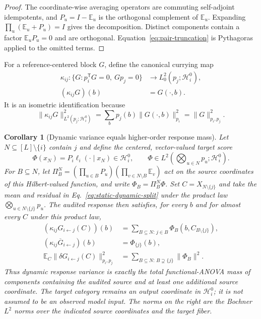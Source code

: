 \documentclass[10pt]{article}
\newcommand{\E}{\mathbb E}
\newtheorem{corollary}[theorem]{Corollary}
\theoremstyle{definition}
\theoremstyle{remark}
\begin{document}
\begin{proof}
The coordinate-wise averaging operators are commuting self-adjoint idempotents, and
$P_u=I-\mathbb E_u$ is the orthogonal complement of $\mathbb E_u$.  Expanding
$\prod_u(\mathbb E_u+P_u)=I$ gives the decomposition.  Distinct components contain a factor
$\mathbb E_uP_u=0$ and are orthogonal.  Equation~\ref{eq:pair-truncation} is Pythagoras applied to the
omitted terms.
\end{proof}

For a reference-centered block $G$, define the canonical currying map
\begin{equation}
\begin{aligned}
\kappa_{ij}:\{G:p_i^{\mathsf T}G=0,\ Gp_j=0\}
&\longrightarrow L_0^2(p_j;\mathcal H_i^0),\\
(\kappa_{ij}G)(b)&=G(\mathord\cdot,b).
\end{aligned}
\label{eq:block-bochner-identification}
\end{equation}
It is an isometric identification because
\begin{equation}
\|\kappa_{ij}G\|_{L^2(p_j;\mathcal H_i^0)}^2
=\sum_b p_j(b)\|G(\mathord\cdot,b)\|_{p_i}^2
=\|G\|_{p_i,p_j}^2.
\label{eq:block-bochner-isometry}
\end{equation}

\begin{corollary}[Dynamic variance equals higher-order response mass]
\label{cor:dynamic-higher-order}
Let $N\subseteq[L]\setminus\{i\}$ contain $j$ and define the centered, vector-valued target score
\begin{equation}
\Phi(x_N)=P_i\ell_i(\mathord\cdot\mid x_N)
\in\mathcal H_i^0,
\qquad
\Phi\in L^2\!\left(\bigotimes_{u\in N}p_u;\mathcal H_i^0\right).
\label{eq:vector-valued-target-score}
\end{equation}
For $B\subseteq N$, let
$\Pi_B^N=(\prod_{u\in B}P_u)(\prod_{v\in N\setminus B}\mathbb E_v)$ act on the source coordinates of this
Hilbert-valued function, and write $\Phi_B=\Pi_B^N\Phi$.  Set
$C=X_{N\setminus\{j\}}$ and take the mean and residual in
Eq.~\ref{eq:static-dynamic-split} under the product law
$\bigotimes_{u\in N\setminus\{j\}}p_u$.  The audited response then satisfies, for every $b$ and
for almost every $C$ under this product law,
\begin{align}
(\kappa_{ij}G_{i\leftarrow j}(C))(b)
&=\sum_{B\subseteq N:\,j\in B}
\Phi_B\!\left(b,C_{B\setminus\{j\}}\right),\\
(\kappa_{ij}\overline G_{i\leftarrow j})(b)&=\Phi_{\{j\}}(b),\\
\E_C\|\delta G_{i\leftarrow j}(C)\|_{p_i,p_j}^2
&=\sum_{B\subseteq N:\,B\supsetneq\{j\}}\|\Phi_B\|^2.
\label{eq:dynamic-higher-order}
\end{align}
Thus dynamic response variance is exactly the total functional-ANOVA mass of components containing
the audited source and at least one additional source coordinate.  The target category remains an
output coordinate in $\mathcal H_i^0$; it is not assumed to be an observed model input.
The norms on the right are the Bochner $L^2$ norms over the indicated source coordinates and the
target fiber.
\end{corollary}
\end{document}

